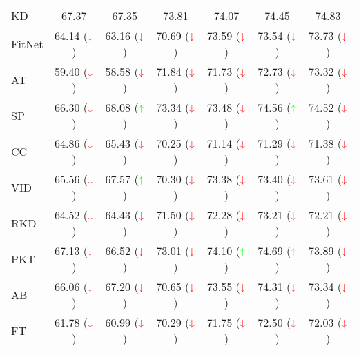 \documentclass[final]{cvpr}
\theoremstyle{definition}
\newcommand*{\mathcolor}{}
\def\mathcolor#1#{\mathcoloraux{#1}}
\newcommand*{\mathcoloraux}[3]{\protect\leavevmode
  \begingroup
    \color#1{#2}#3\endgroup
}
\begin{document}
\begin{table*}[t!]
\begin{center}
\begin{tabular}{lcccccc}
KD  & 67.37 & 67.35 & 73.81 & 74.07 & 74.45 & 74.83 \\
FitNet  & 64.14 ($\mathcolor{red}{\downarrow}$)& 63.16 ($\mathcolor{red}{\downarrow}$)& 70.69 ($\mathcolor{red}{\downarrow}$)& 73.59 ($\mathcolor{red}{\downarrow}$)& 73.54 ($\mathcolor{red}{\downarrow}$)& 73.73 ($\mathcolor{red}{\downarrow}$)\\
AT & 59.40 ($\mathcolor{red}{\downarrow}$)& 58.58 ($\mathcolor{red}{\downarrow}$)& 71.84 ($\mathcolor{red}{\downarrow}$)& 71.73 ($\mathcolor{red}{\downarrow}$)& 72.73 ($\mathcolor{red}{\downarrow}$)& 73.32 ($\mathcolor{red}{\downarrow}$)\\
SP & 66.30 ($\mathcolor{red}{\downarrow}$)& 68.08 ($\mathcolor{green}{\uparrow}$)& 73.34 ($\mathcolor{red}{\downarrow}$)& 73.48 ($\mathcolor{red}{\downarrow}$)& 74.56 ($\mathcolor{green}{\uparrow}$)& 74.52 ($\mathcolor{red}{\downarrow}$)\\
CC & 64.86 ($\mathcolor{red}{\downarrow}$)& 65.43 ($\mathcolor{red}{\downarrow}$)& 70.25 ($\mathcolor{red}{\downarrow}$)& 71.14 ($\mathcolor{red}{\downarrow}$)& 71.29 ($\mathcolor{red}{\downarrow}$)& 71.38 ($\mathcolor{red}{\downarrow}$)\\
VID & 65.56 ($\mathcolor{red}{\downarrow}$)& 67.57 ($\mathcolor{green}{\uparrow}$)& 70.30 ($\mathcolor{red}{\downarrow}$)& 73.38 ($\mathcolor{red}{\downarrow}$)& 73.40 ($\mathcolor{red}{\downarrow}$)& 73.61 ($\mathcolor{red}{\downarrow}$)\\
RKD & 64.52 ($\mathcolor{red}{\downarrow}$)& 64.43 ($\mathcolor{red}{\downarrow}$)& 71.50 ($\mathcolor{red}{\downarrow}$)& 72.28 ($\mathcolor{red}{\downarrow}$)& 73.21 ($\mathcolor{red}{\downarrow}$)& 72.21 ($\mathcolor{red}{\downarrow}$)\\
PKT & 67.13 ($\mathcolor{red}{\downarrow}$)& 66.52 ($\mathcolor{red}{\downarrow}$)& 73.01 ($\mathcolor{red}{\downarrow}$)& 74.10 ($\mathcolor{green}{\uparrow}$)& 74.69 ($\mathcolor{green}{\uparrow}$)& 73.89 ($\mathcolor{red}{\downarrow}$)\\
AB & 66.06 ($\mathcolor{red}{\downarrow}$)& 67.20 ($\mathcolor{red}{\downarrow}$)& 70.65 ($\mathcolor{red}{\downarrow}$)& 73.55 ($\mathcolor{red}{\downarrow}$)& 74.31 ($\mathcolor{red}{\downarrow}$)& 73.34 ($\mathcolor{red}{\downarrow}$)\\
FT  & 61.78 ($\mathcolor{red}{\downarrow}$)& 60.99 ($\mathcolor{red}{\downarrow}$)& 70.29 ($\mathcolor{red}{\downarrow}$)& 71.75 ($\mathcolor{red}{\downarrow}$)& 72.50 ($\mathcolor{red}{\downarrow}$)& 72.03 ($\mathcolor{red}{\downarrow}$)\\

\end{tabular}
\end{center}
\end{table*}
\end{document}
